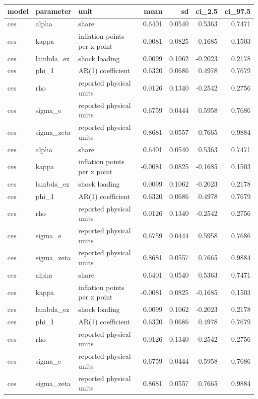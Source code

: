 \begin{tabular}{lllrrrr}
\toprule
model & parameter & unit & mean & sd & ci\_2.5 & ci\_97.5 \\
\midrule
ces & alpha & share & 0.6401 & 0.0540 & 0.5363 & 0.7471 \\
ces & kappa & inflation points per x point & -0.0081 & 0.0825 & -0.1685 & 0.1503 \\
ces & lambda\_ez & shock loading & 0.0099 & 0.1062 & -0.2023 & 0.2178 \\
ces & phi\_1 & AR(1) coefficient & 0.6320 & 0.0686 & 0.4978 & 0.7679 \\
ces & rho & reported physical units & 0.0126 & 0.1340 & -0.2542 & 0.2756 \\
ces & sigma\_e & reported physical units & 0.6759 & 0.0444 & 0.5958 & 0.7686 \\
ces & sigma\_zeta & reported physical units & 0.8681 & 0.0557 & 0.7665 & 0.9884 \\
ces & alpha & share & 0.6401 & 0.0540 & 0.5363 & 0.7471 \\
ces & kappa & inflation points per x point & -0.0081 & 0.0825 & -0.1685 & 0.1503 \\
ces & lambda\_ez & shock loading & 0.0099 & 0.1062 & -0.2023 & 0.2178 \\
ces & phi\_1 & AR(1) coefficient & 0.6320 & 0.0686 & 0.4978 & 0.7679 \\
ces & rho & reported physical units & 0.0126 & 0.1340 & -0.2542 & 0.2756 \\
ces & sigma\_e & reported physical units & 0.6759 & 0.0444 & 0.5958 & 0.7686 \\
ces & sigma\_zeta & reported physical units & 0.8681 & 0.0557 & 0.7665 & 0.9884 \\
ces & alpha & share & 0.6401 & 0.0540 & 0.5363 & 0.7471 \\
ces & kappa & inflation points per x point & -0.0081 & 0.0825 & -0.1685 & 0.1503 \\
ces & lambda\_ez & shock loading & 0.0099 & 0.1062 & -0.2023 & 0.2178 \\
ces & phi\_1 & AR(1) coefficient & 0.6320 & 0.0686 & 0.4978 & 0.7679 \\
ces & rho & reported physical units & 0.0126 & 0.1340 & -0.2542 & 0.2756 \\
ces & sigma\_e & reported physical units & 0.6759 & 0.0444 & 0.5958 & 0.7686 \\
ces & sigma\_zeta & reported physical units & 0.8681 & 0.0557 & 0.7665 & 0.9884 \\

\end{tabular}
